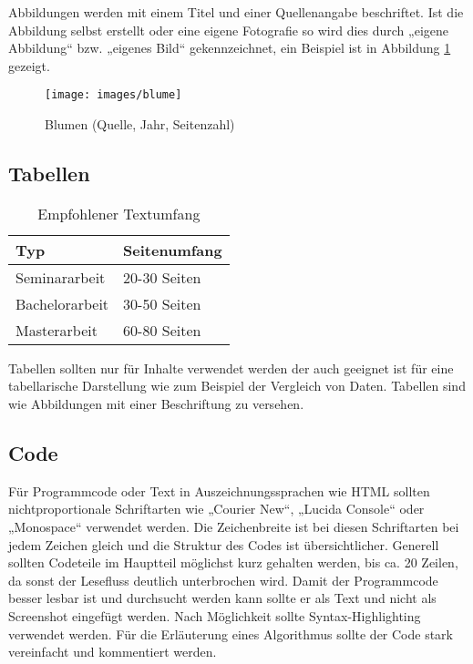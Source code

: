 Abbildungen werden mit einem Titel und einer Quellenangabe beschriftet.
Ist die Abbildung selbst erstellt oder eine eigene Fotografie so wird dies durch „eigene Abbildung“ bzw. „eigenes Bild“ gekennzeichnet, ein Beispiel ist in Abbildung \ref{fig:abbildung} gezeigt.

\begin{figure}
	\centering
	\texttt{[image: images/blume]}
	\caption{Blumen (Quelle, Jahr, Seitenzahl)}
	\label{fig:abbildung}
\end{figure}

\subsection{Tabellen}\label{subsubsec:tabellen}

{\renewcommand{\arraystretch}{1.5}
\begin{table}[h!]
\centering
\begin{tabular}{ l|l } 
\hline
\bfseries Typ & \bfseries Seitenumfang\\
\hline
Seminararbeit & 20-30 Seiten \\
Bachelorarbeit & 30-50 Seiten \\
Masterarbeit & 60-80 Seiten \\
\hline
\end{tabular}
\caption{Empfohlener Textumfang}
\label{table:textumfang}
\end{table}}

Tabellen sollten nur für Inhalte verwendet werden der auch geeignet ist für eine tabellarische Darstellung wie zum Beispiel der Vergleich von Daten.
Tabellen sind wie Abbildungen mit einer Beschriftung zu versehen.

\subsection{Code}\label{subsubsec:code}

Für Programmcode oder Text in Auszeichnungssprachen wie HTML sollten nichtproportionale Schriftarten wie „Courier New“, „Lucida Console“ oder „Monospace“ verwendet werden.
Die Zeichenbreite ist bei diesen Schriftarten bei jedem Zeichen gleich und die Struktur des Codes ist übersichtlicher.
Generell sollten Codeteile im Hauptteil möglichst kurz gehalten werden, bis ca. 20 Zeilen, da sonst der Lesefluss deutlich unterbrochen wird.
Damit der Programmcode besser lesbar ist und durchsucht werden kann sollte er als Text und nicht als Screenshot eingefügt werden.
Nach Möglichkeit sollte Syntax-Highlighting verwendet werden.
Für die  Erläuterung eines Algorithmus sollte der Code stark vereinfacht und kommentiert werden.


